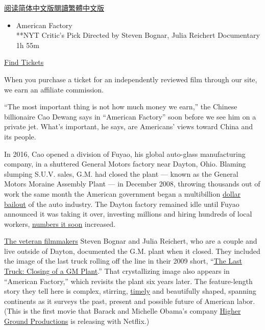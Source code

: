 \href{https://cn.nytimes.com/culture/20190827/american-factory-review/}{阅读简体中文版}\href{https://cn.nytimes.com/culture/20190827/american-factory-review/zh-hant/}{閱讀繁體中文版}

\begin{itemize}
\tightlist
\item
  American Factory\\
  **NYT Critic's Pick Directed by Steven Bognar, Julia Reichert
  Documentary 1h 55m
\end{itemize}

\href{https://www.imdb.com/showtimes/title/tt9351980?ref_=ref_ext_NYT}{Find
Tickets}

When you purchase a ticket for an independently reviewed film through
our site, we earn an affiliate commission.

``The most important thing is not how much money we earn,'' the Chinese
billionaire Cao Dewang says in ``American Factory'' soon before we see
him on a private jet. What's important, he says, are Americans' views
toward China and its people.

In 2016, Cao opened a division of Fuyao, his global auto-glass
manufacturing company, in a shuttered General Motors factory near
Dayton, Ohio. Blaming slumping S.U.V. sales, G.M. had closed the plant
--- known as the General Motors Moraine Assembly Plant --- in December
2008, throwing thousands out of work the same month the American
government began a multibillion
\href{https://dealbook.nytimes.com/2013/12/09/u-s-sells-remaining-stake-in-gm/?rref=collection\%2Ftimestopic\%2FAuto\%20Bailout\&action=click\&contentCollection=timestopics\&region=stream\&module=stream_unit\&version=latest\&contentPlacement=9\&pgtype=collection}{dollar
bailout} of the auto industry. The Dayton factory remained idle until
Fuyao announced it was taking it over, investing millions and hiring
hundreds of local workers,
\href{https://www.daytondailynews.com/news/breaking-news/fuyao-set-double-hiring-moraine-plant-500-jobs/XIW2hI9dJ3w0Rw5Uw8KVnL/}{numbers
it soon} increased.

\href{https://www.documentary.org/online-feature/meet-academy-award-nominees-steven-bognar-and-julia-reichert-last-truck-closing-gm}{The
veteran filmmakers} Steven Bognar and Julia Reichert, who are a couple
and live outside of Dayton, documented the G.M. plant when it closed.
They included the image of the last truck rolling off the line in their
2009 short,
``\href{https://www.hbo.com/content/hboweb/en/documentaries/the-last-truck-closing-of-a-gm-plant/synopsis.html}{The
Last Truck: Closing of a GM Plant}.'' That crystallizing image also
appears in ``American Factory,'' which revisits the plant six years
later. The feature-length story they tell here is complex, stirring,
\href{https://www.nytimes.com/2019/07/26/us/politics/trump-wto-china.html}{timely}
and beautifully shaped, spanning continents as it surveys the past,
present and possible future of American labor. (This is the first movie
that Barack and Michelle Obama's company
\href{https://www.nytimes.com/2019/04/30/business/media/obama-netflix-shows.html}{Higher
Ground Productions} is releasing with Netflix.)

